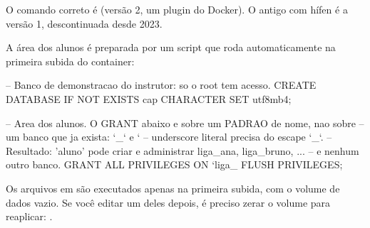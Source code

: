 \begin{dica}
O comando correto é  (versão 2, um plugin do Docker).
O antigo  com hífen é a versão 1, descontinuada
desde 2023.
\end{dica}

\newpage

A área dos alunos é preparada por um script que roda automaticamente na
primeira subida do container:

\begin{sqlcode}[caption={infrastructure/init/01\_create\_databases.sql (trecho)},label={lst:init}]
-- Banco de demonstracao do instrutor: so o root tem acesso.
CREATE DATABASE IF NOT EXISTS cap CHARACTER SET utf8mb4;

-- Area dos alunos. O GRANT abaixo e sobre um PADRAO de nome, nao sobre
-- um banco que ja exista: `_` e `%
-- underscore literal precisa do escape `\_`.
-- Resultado: 'aluno' pode criar e administrar liga_ana, liga_bruno, ...
-- e nenhum outro banco.
GRANT ALL PRIVILEGES ON `liga\_%
FLUSH PRIVILEGES;
\end{sqlcode}

\begin{aviso}
Os arquivos em  são executados apenas na primeira subida, com o
volume de dados vazio. Se você editar um deles depois, é preciso zerar o volume
para reaplicar: .
\end{aviso}
